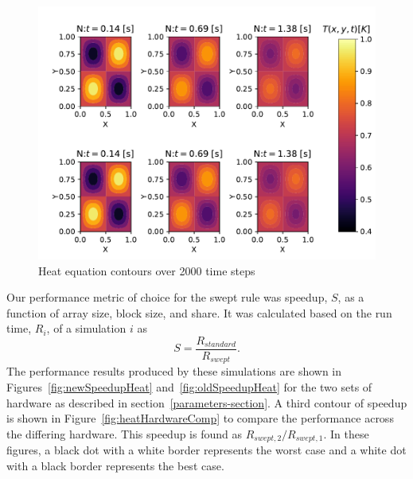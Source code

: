 \documentclass[journal,article,submit,moreauthors,pdftex]{Definitions/mdpi}
\newcommand\fs{1}
\begin{document}
\begin{figure}
    \widefigure
    \begin{center}
        \includegraphics[scale=\fs, trim={0.9cm 0.4cm 0.1cm 0.9cm},clip]{figs/heatValidate.pdf}
    \end{center}
    \caption{Heat equation contours over 2000 time steps}
    \label{fig:heatSurface}
\end{figure}
\begin{paracol}{2}
\linenumbers
\switchcolumn

Our performance metric of choice for the swept rule was speedup, $S$, as a function of array size, block size, and share. It was calculated based on the run time, $R_i$, of a simulation $i$ as
\begin{equation}
    S = \frac{R_{standard}}{R_{swept}}.
\end{equation}
The performance results produced by these simulations are shown in Figures~\ref{fig:newSpeedupHeat} and~\ref{fig:oldSpeedupHeat} for the two sets of hardware as described in section~\ref{parameters-section}. 
A third contour of speedup is shown in Figure~\ref{fig:heatHardwareComp} to compare the performance across the differing hardware. This speedup is found as $R_{swept,2}/R_{swept,1}$. In these figures, a black dot with a white border represents the worst case and a white dot with a black border represents the best case.

\end{paracol}
\end{document}

